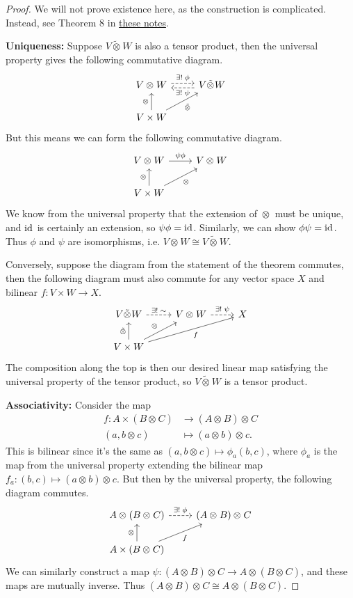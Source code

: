 \documentclass[twoside,10pt]{article}
\begin{document}
\begin{proof}
	We will not prove existence here, as the construction is complicated. Instead, see Theorem 8 in \href{https://bhoagsbargrill.com/latex/notes/module_theory/module_theory.pdf}{these notes}.

	\textbf{Uniqueness:} Suppose $V \tilde{\otimes_{}} W$ is also a tensor product, then the universal property gives the following commutative diagram.
	\[
	\begin{tikzcd}
		V \otimes_{}W \rar[shift left,dashed]{\exists!\;\phi} & V \tilde{\otimes_{}} W \lar[shift left,dashed]{\exists!\;\psi} \\
		V \times W \uar{\otimes_{}} \arrow[ur,"\tilde{\otimes_{}}"']
	\end{tikzcd}
	\] 
But this means we can form the following commutative diagram.
\[
\begin{tikzcd}
	V \otimes_{}W \rar{\psi \phi} & V \otimes_{}W \\
	V\times W \uar{\otimes_{}} \arrow[ur,"\otimes_{}"']
\end{tikzcd}
\] We know from the universal property that the extension of $\otimes_{}$ must be unique, and $\operatorname{id}_{}$ is certainly an extension, so $\psi \phi = \operatorname{id}_{}$. Similarly, we can show $\phi \psi=\operatorname{id}_{}$. Thus $\phi$ and $\psi$ are isomorphisms, i.e. $V \otimes_{}W \cong V \tilde{\otimes_{}} W$.

Conversely, suppose the diagram from the statement of the theorem commutes, then the following diagram must also commute for any vector space $X$ and bilinear $f:V \times W \to X$.
\[
\begin{tikzcd}
	V \tilde{\otimes_{}} W \rar[dashed]{\exists!\;\sim} & V \otimes_{}W \rar[dashed]{\exists!\;\psi} & X \\
	V \times W \uar{\tilde{\otimes_{}}} \arrow[ur,"\otimes_{}"] \arrow[urr,"f"']
\end{tikzcd}
\] 
The composition along the top is then our desired linear map satisfying the universal property of the tensor product, so $V \tilde{\otimes_{}} W$ is a tensor product.

\textbf{Associativity:} Consider the map
\begin{align*}
	f: A \times (B \otimes_{}C) &\to (A \otimes_{}B)\otimes_{}C \\
	(a, b \otimes_{} c) &\mapsto (a \otimes_{}b)\otimes_{}c.
\end{align*}
This is bilinear since it's the same as $(a,b \otimes_{}c) \mapsto \phi_a(b,c)$, where $\phi_a$ is the map from the universal property extending the bilinear map $f_a: (b,c) \mapsto (a \otimes_{}b)\otimes_{}c$. But then by the universal property, the following diagram commutes.
\[
\begin{tikzcd}
	A \otimes_{}(B\otimes_{}C) \rar[dashed]{\exists!\;\phi} & (A \otimes_{}B)\otimes_{}C \\
		A \times (B\otimes_{}C) \uar{\otimes_{}} \arrow[ur,"f"']
\end{tikzcd}
\] 
We can similarly construct a map $\psi: (A\otimes_{}B)\otimes_{}C \to A \otimes_{}(B\otimes_{}C)$, and these maps are mutually inverse. Thus $(A\otimes_{}B)\otimes_{}C \cong  A \otimes_{}(B\otimes_{}C)$.

\end{proof}
\end{document}
